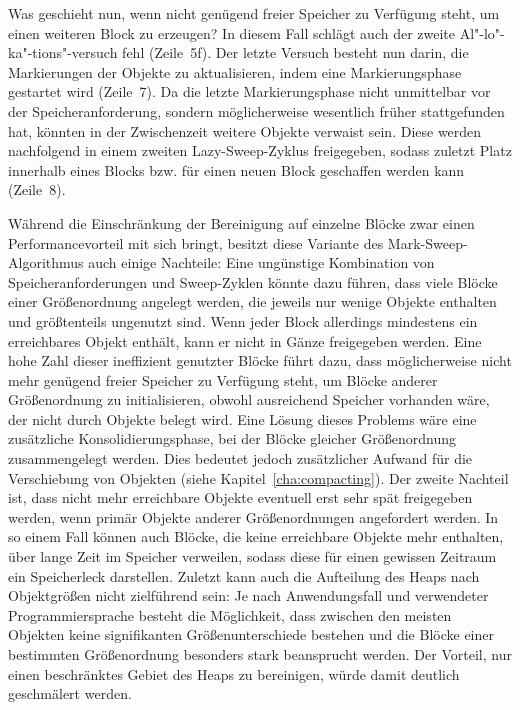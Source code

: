 Was geschieht nun, wenn nicht genügend freier Speicher zu Verfügung steht, um einen weiteren Block zu erzeugen?
In diesem Fall schlägt auch der zweite Al"-lo"-ka"-tions"-versuch fehl (Zeile~5f).
Der letzte Versuch besteht nun darin, die Markierungen der Objekte zu aktualisieren, indem eine Markierungsphase gestartet wird (Zeile~7).
Da die letzte Markierungsphase nicht unmittelbar vor der Speicheranforderung, sondern möglicherweise wesentlich früher stattgefunden hat, könnten in der Zwischenzeit weitere Objekte verwaist sein.
Diese werden nachfolgend in einem zweiten Lazy-Sweep-Zyklus freigegeben, sodass zuletzt Platz innerhalb eines Blocks bzw. für einen neuen Block geschaffen werden kann (Zeile~8).

Während die Einschränkung der Bereinigung auf einzelne Blöcke zwar einen Performancevorteil mit sich bringt, besitzt diese Variante des Mark-Sweep-Algorithmus auch einige Nachteile:
Eine ungünstige Kombination von Speicheranforderungen und Sweep-Zyklen könnte dazu führen, dass viele Blöcke einer Größenordnung angelegt werden, die jeweils nur wenige Objekte enthalten und größtenteils ungenutzt sind.
Wenn jeder Block allerdings mindestens ein erreichbares Objekt enthält, kann er nicht in Gänze freigegeben werden.
Eine hohe Zahl dieser ineffizient genutzter Blöcke führt dazu, dass möglicherweise nicht mehr genügend freier Speicher zu Verfügung steht, um Blöcke anderer Größenordnung zu initialisieren, obwohl ausreichend Speicher vorhanden wäre, der nicht durch Objekte belegt wird.
Eine Lösung dieses Problems wäre eine zusätzliche Konsolidierungsphase, bei der Blöcke gleicher Größenordnung zusammengelegt werden.
Dies bedeutet jedoch zusätzlicher Aufwand für die Verschiebung von Objekten (siehe Kapitel~\ref{cha:compacting}).
Der zweite Nachteil ist, dass nicht mehr erreichbare Objekte eventuell erst sehr spät freigegeben werden, wenn primär Objekte anderer Größenordnungen angefordert werden.
In so einem Fall können auch Blöcke, die keine erreichbare Objekte mehr enthalten, über lange Zeit im Speicher verweilen, sodass diese für einen gewissen Zeitraum ein Speicherleck darstellen.
Zuletzt kann auch die Aufteilung des Heaps nach Objektgrößen nicht zielführend sein:
Je nach Anwendungsfall und verwendeter Programmiersprache besteht die Möglichkeit, dass zwischen den meisten Objekten keine signifikanten Größenunterschiede bestehen und die Blöcke einer bestimmten Größenordnung besonders stark beansprucht werden.
Der Vorteil, nur einen beschränktes Gebiet des Heaps zu bereinigen, würde damit deutlich geschmälert werden.


